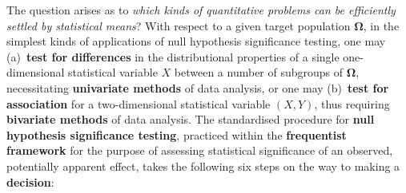 \medskip
\noindent
The question arises as to \textit{which kinds of quantitative 
problems can be efficiently settled by statistical means}?
With respect to a given target population $\boldsymbol{\Omega}$, 
in the simplest kinds of applications of null hypothesis
significance testing, one may (a)~\textbf{test for differences} in
the distributional properties of a single one-dimensional
statistical variable $X$ between a number of subgroups of
$\boldsymbol{\Omega}$, necessitating \textbf{univariate methods} of
data analysis, or one may (b)~\textbf{test for association} for a
two-dimensional statistical variable $(X,Y)$, thus requiring
\textbf{bivariate methods} of data analysis. The standardised
procedure for \textbf{null hypothesis significance testing},
practiced within the \textbf{frequentist framework} for the purpose
of assessing statistical significance of an observed, potentially
apparent effect, takes the following six steps on the way to making
a \textbf{decision}:

